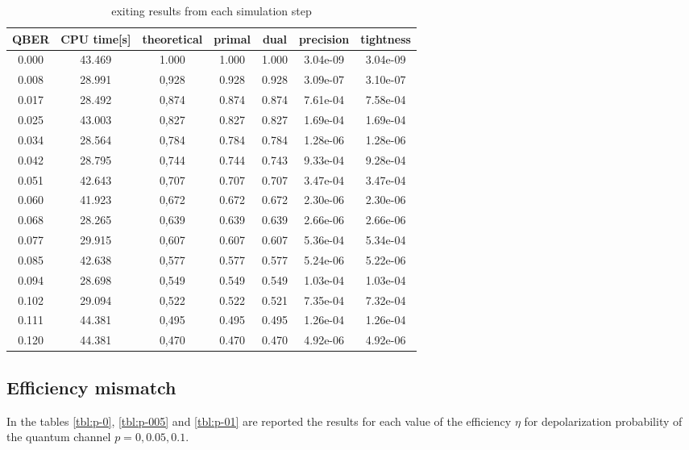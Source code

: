 \documentclass{article}
\begin{document}
 \begin{table}[h!]
    \centering
    \begin{tabular}{c|c|c|c|c|c|c}
        QBER & CPU time[s]& theoretical& primal& dual& precision& tightness\\
        \hline
        0.000 & 43.469 & 1.000 & 1.000 & 1.000 & 3.04e-09 & 3.04e-09\\
        0.008 & 28.991 & 0,928 & 0.928 & 0.928 & 3.09e-07 & 3.10e-07\\
        0.017 & 28.492 & 0,874 & 0.874 & 0.874 & 7.61e-04 & 7.58e-04\\
        0.025 & 43.003 & 0,827 & 0.827 & 0.827 & 1.69e-04 & 1.69e-04\\
        0.034 & 28.564 & 0,784 & 0.784 & 0.784 & 1.28e-06 & 1.28e-06\\
        0.042 & 28.795 & 0,744 & 0.744 & 0.743 & 9.33e-04 & 9.28e-04\\
        0.051 & 42.643 & 0,707 & 0.707 & 0.707 & 3.47e-04 & 3.47e-04\\
        0.060 & 41.923 & 0,672 & 0.672 & 0.672 & 2.30e-06 & 2.30e-06\\
        0.068 & 28.265 & 0,639 & 0.639 & 0.639 & 2.66e-06 & 2.66e-06\\
        0.077 & 29.915 & 0,607 & 0.607 & 0.607 & 5.36e-04 & 5.34e-04\\
        0.085 & 42.638 & 0,577 & 0.577 & 0.577 & 5.24e-06 & 5.22e-06\\
        0.094 & 28.698 & 0,549 & 0.549 & 0.549 & 1.03e-04 & 1.03e-04\\
        0.102 & 29.094 & 0,522 & 0.522 & 0.521 & 7.35e-04 & 7.32e-04\\
        0.111 & 44.381 & 0,495 & 0.495 & 0.495 & 1.26e-04 & 1.26e-04\\
        0.120 & 44.381 & 0,470 & 0.470 & 0.470 & 4.92e-06 & 4.92e-06\\
        \hline
    \end{tabular}
    \caption{exiting results from each simulation step}
    \label{tbl:std-bb84}
 \end{table}

 \subsection{Efficiency mismatch}
 In the tables \ref{tbl:p-0}, \ref{tbl:p-005} and \ref{tbl:p-01} are reported the results for each value of the efficiency \(\eta\) for depolarization probability of the quantum channel \(p=0,0.05,0.1\).
\end{document}
